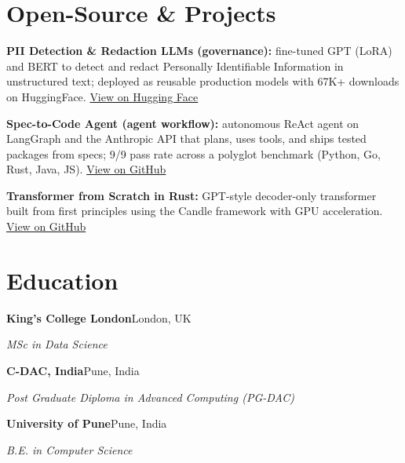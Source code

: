 \documentclass[10pt,a4paper]{article}
\begin{document}
\section{Open-Source \& Projects}
\begin{tight}
  \item \textbf{PII Detection \& Redaction LLMs (governance):} fine-tuned GPT (LoRA) and BERT to detect and redact Personally Identifiable Information in unstructured text; deployed as reusable production models with 67K+ downloads on HuggingFace. \href{https://huggingface.co/ab-ai/pii_model}{View on Hugging Face}
  \item \textbf{Spec-to-Code Agent (agent workflow):} autonomous ReAct agent on LangGraph and the Anthropic API that plans, uses tools, and ships tested packages from specs; 9/9 pass rate across a polyglot benchmark (Python, Go, Rust, Java, JS). \href{https://github.com/abhijeetscode/Spec-to-Code-Agent}{View on GitHub}
  \item \textbf{Transformer from Scratch in Rust:} GPT-style decoder-only transformer built from first principles using the Candle framework with GPU acceleration. \href{https://github.com/abhijeetscode/transformer-rust}{View on GitHub}
\end{tight}

\section{Education}
{\color{company}\bfseries King's College London}\hfill {\color{muted}London, UK}\par
{\itshape MSc in Data Science}\par\vspace{2pt}
{\color{company}\bfseries C-DAC, India}\hfill {\color{muted}Pune, India}\par
{\itshape Post Graduate Diploma in Advanced Computing (PG-DAC)}\par\vspace{2pt}
{\color{company}\bfseries University of Pune}\hfill {\color{muted}Pune, India}\par
{\itshape B.E. in Computer Science}\par
\end{document}
